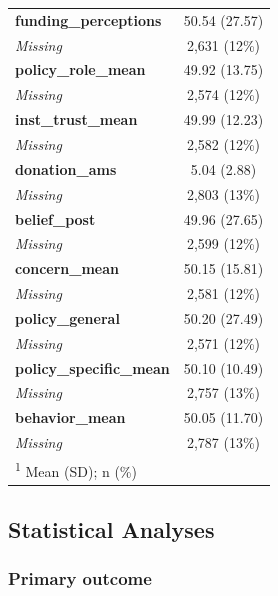 \documentclass[
  letterpaper,
  DIV=11,
  numbers=noendperiod]{scrartcl}
\begin{document}
\begin{longtable}{lc}
\addlinespace
\textbf{funding\_perceptions} & 50.54 (27.57)\\
\hspace{1em}\em{Missing} & 2,631 (12\%)\\
\textbf{policy\_role\_mean} & 49.92 (13.75)\\
\hspace{1em}\em{Missing} & 2,574 (12\%)\\
\textbf{inst\_trust\_mean} & 49.99 (12.23)\\
\addlinespace
\hspace{1em}\em{Missing} & 2,582 (12\%)\\
\textbf{donation\_ams} & 5.04 (2.88)\\
\hspace{1em}\em{Missing} & 2,803 (13\%)\\
\textbf{belief\_post} & 49.96 (27.65)\\
\hspace{1em}\em{Missing} & 2,599 (12\%)\\
\addlinespace
\textbf{concern\_mean} & 50.15 (15.81)\\
\hspace{1em}\em{Missing} & 2,581 (12\%)\\
\textbf{policy\_general} & 50.20 (27.49)\\
\hspace{1em}\em{Missing} & 2,571 (12\%)\\
\textbf{policy\_specific\_mean} & 50.10 (10.49)\\
\addlinespace
\hspace{1em}\em{Missing} & 2,757 (13\%)\\
\textbf{behavior\_mean} & 50.05 (11.70)\\
\hspace{1em}\em{Missing} & 2,787 (13\%)\\*
\multicolumn{2}{l}{\rule{0pt}{1em}\textsuperscript{1} Mean (SD); n (\%)}\\

\end{longtable}

\endgroup{}

\subsection{Statistical Analyses}\label{statistical-analyses}

\subsubsection{Primary outcome}\label{primary-outcome-1}
\end{document}
